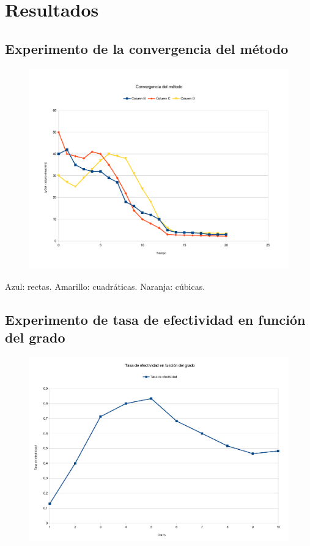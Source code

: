 \section{Resultados}

\subsection{Experimento de la convergencia del método}
\begin{figure}[H]{}
\centering
\includegraphics[scale=0.5]{graphs/convergenciaMetodo.pdf}
\label{convergenciaMetodo}
\end{figure}

Azul: rectas. Amarillo: cuadráticas. Naranja: cúbicas.

\subsection{Experimento de tasa de efectividad en función del grado}
\begin{figure}[H]{}
\centering
\includegraphics[scale=0.5]{graphs/TEvsGrado.pdf}
\label{TEvsGrado}
\end{figure}

